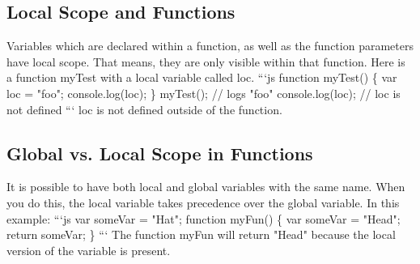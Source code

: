 \documentclass{article}%
\begin{document}
\subsection{Local Scope and Functions}%
\label{subsec:LocalScopeandFunctions}%
Variables which are declared within a function, as well as the function parameters have local scope. That means, they are only visible within that function.\newline%
Here is a function myTest with a local variable called loc.\newline%
```js\newline%
function myTest() \{\newline%
  var loc = "foo";\newline%
  console.log(loc);\newline%
\}\newline%
myTest(); // logs "foo"\newline%
console.log(loc); // loc is not defined\newline%
```\newline%
loc is not defined outside of the function.\newline%

%
\subsection{Global vs. Local Scope in Functions}%
\label{subsec:Globalvs.LocalScopeinFunctions}%
It is possible to have both local and global variables with the same name. When you do this, the local variable takes precedence over the global variable.\newline%
In this example:\newline%
```js\newline%
var someVar = "Hat";\newline%
function myFun() \{\newline%
  var someVar = "Head";\newline%
  return someVar;\newline%
\}\newline%
```\newline%
The function myFun will return "Head" because the local version of the variable is present.\newline%

%
\end{document}
